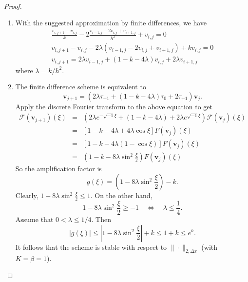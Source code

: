 \documentclass[a4paper,12pt]{article}
\begin{document}
\begin{enumerate}
\begin{proof}\mbox{}
\begin{enumerate}
\item With the suggested approximation by finite differences, we have
\begin{gather*}
\frac{v_{i,j+1}-v_{i,j}}k - 2 \frac{v_{i-1,j}-2v_{i,j}+v_{i+1,j}}{h^2} + v_{i,j} = 0\\
v_{i,j+1}-v_{i,j} - 2\lambda \left( v_{i-1,j}-2v_{i,j}+v_{i+1,j} \right) + k v_{i,j} = 0\\
v_{i,j+1} = 2\lambda v_{i-1,j} + (1-k-4\lambda) v_{i,j} + 2\lambda v_{i+1,j}
\end{gather*}
where $\lambda=k/h^2$.

\item The finite difference scheme is equivalent to
\[ \mathbf v_{j+1} = \left( 2\lambda \tau_{-1} + (1-k-4\lambda) \tau_0 + 2\tau_{+1} \right) \mathbf v_j. \]
Apply the discrete Fourier transform to the above equation to get
\begin{eqnarray*}
\mathcal F(\mathbf v_{j+1})(\xi) &=& \left( 2\lambda e^{-\sqrt{-1}\xi} + (1-k-4\lambda) + 2\lambda e^{\sqrt{-1}\xi} \right)\mathcal F(\mathbf v_{j})(\xi)\\
&=& \left[ 1 - k - 4\lambda + 4\lambda\cos\xi \right] F(\mathbf v_{j})(\xi)\\
&=& \left[ 1 - k - 4\lambda \left( 1 - \cos\xi \right) \right] F(\mathbf v_{j})(\xi)\\
&=& \left( 1 - k - 8\lambda \sin^2\frac\xi 2 \right) F(\mathbf v_{j})(\xi)
\end{eqnarray*}
So the amplification factor is
\[ g(\xi) = \left( 1 - 8\lambda \sin^2\frac\xi 2 \right) - k. \]
Clearly, $\displaystyle 1 - 8\lambda \sin^2\frac\xi 2 \le 1$. On the other hand,
\[ 1 - 8\lambda \sin^2\frac\xi 2 \ge -1 \quad\iff\quad \lambda \le \frac 14. \]
Assume that $0 < \lambda \le 1/4$. Then
\[ |g(\xi)| \le \left| 1 - 8\lambda \sin^2\frac\xi 2 \right| + k \le 1+k \le e^{k}. \]
It follows that the scheme is stable with respect to $\|\cdot\|_{2,\Delta x}$ (with $K=\beta=1$).


\end{enumerate}
\end{proof}
\end{enumerate}
\end{document}
